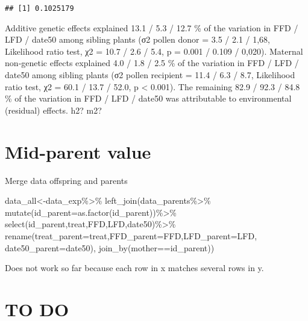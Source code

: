 \documentclass[
]{article}
\newenvironment{Shaded}{\begin{snugshade}}{\end{snugshade}}
\newcommand{\AttributeTok}[1]{\textcolor[rgb]{0.77,0.63,0.00}{#1}}
\newcommand{\FunctionTok}[1]{\textcolor[rgb]{0.00,0.00,0.00}{#1}}
\newcommand{\NormalTok}[1]{#1}
\newcommand{\OtherTok}[1]{\textcolor[rgb]{0.56,0.35,0.01}{#1}}
\newcommand{\SpecialCharTok}[1]{\textcolor[rgb]{0.00,0.00,0.00}{#1}}
\begin{document}
\begin{verbatim}
## [1] 0.1025179
\end{verbatim}

Additive genetic effects explained 13.1 / 5.3 / 12.7 \% of the variation
in FFD / LFD / date50 among sibling plants (σ2 pollen donor = 3.5 / 2.1
/ 1,68, Likelihood ratio test, χ2 = 10.7 / 2.6 / 5.4, p = 0.001 / 0.109
/ 0,020). Maternal non‐genetic effects explained 4.0 / 1.8 / 2.5 \% of
the variation in FFD / LFD / date50 among sibling plants (σ2 pollen
recipient = 11.4 / 6.3 / 8.7, Likelihood ratio test, χ2 = 60.1 / 13.7 /
52.0, p \textless{} 0.001). The remaining 82.9 / 92.3 / 84.8 \% of the
variation in FFD / LFD / date50 was attributable to environmental
(residual) effects. h2? m2?

\hypertarget{mid-parent-value}{%
\section{Mid-parent value}\label{mid-parent-value}}

Merge data offspring and parents

\begin{Shaded}
\begin{Highlighting}[]
\NormalTok{data\_all}\OtherTok{\textless{}{-}}\NormalTok{data\_exp}\SpecialCharTok{\%\textgreater{}\%}
  \FunctionTok{left\_join}\NormalTok{(data\_parents}\SpecialCharTok{\%\textgreater{}\%}
              \FunctionTok{mutate}\NormalTok{(}\AttributeTok{id\_parent=}\FunctionTok{as.factor}\NormalTok{(id\_parent))}\SpecialCharTok{\%\textgreater{}\%}
              \FunctionTok{select}\NormalTok{(id\_parent,treat,FFD,LFD,date50)}\SpecialCharTok{\%\textgreater{}\%}
              \FunctionTok{rename}\NormalTok{(}\AttributeTok{treat\_parent=}\NormalTok{treat,}\AttributeTok{FFD\_parent=}\NormalTok{FFD,}\AttributeTok{LFD\_parent=}\NormalTok{LFD,}
                     \AttributeTok{date50\_parent=}\NormalTok{date50),}
            \FunctionTok{join\_by}\NormalTok{(mother}\SpecialCharTok{==}\NormalTok{id\_parent))}
\end{Highlighting}
\end{Shaded}

Does not work so far because each row in x matches several rows in y.

\hypertarget{to-do}{%
\section{TO DO}\label{to-do}}
\end{document}

